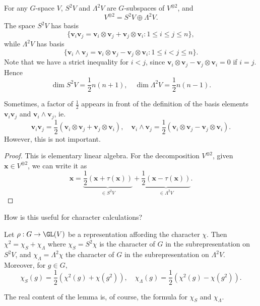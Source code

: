 \documentclass[a4paper]{article}
\begin{document}
\begin{lemma}
  For any $G$-space $V$, $S^2 V$ and $\Lambda^2 V$ are $G$-subspaces of $V^{\otimes 2}$, and
  \[
    V^{\otimes 2} = S^2 V \oplus \Lambda^2 V.
  \]
  The space $S^2 V$ has basis
  \[
    \{\mathbf{v}_i \mathbf{v}_j = \mathbf{v}_i \otimes \mathbf{v}_j + \mathbf{v}_j \otimes \mathbf{v}_i: 1 \leq i \leq j \leq n\},
  \]
  while $\Lambda^2 V$ has basis
  \[
    \{\mathbf{v}_i \wedge \mathbf{v}_j = \mathbf{v}_i \otimes \mathbf{v}_j - \mathbf{v}_j \otimes \mathbf{v}_i: 1 \leq i < j \leq n\}.
  \]
  Note that we have a strict inequality for $i < j$, since $\mathbf{v}_i \otimes \mathbf{v}_j - \mathbf{v}_j \otimes \mathbf{v}_i = 0$ if $i = j$.
  Hence
  \[
    \dim S^2 V = \frac{1}{2}n(n + 1),\quad \dim \Lambda^2 V = \frac{1}{2}n(n - 1).
  \]
\end{lemma}
Sometimes, a factor of $\frac{1}{2}$ appears in front of the definition of the basis elements $\mathbf{v}_i \mathbf{v}_j$ and $\mathbf{v}_i \wedge \mathbf{v}_j$, ie.
\[
  \mathbf{v}_i \mathbf{v}_j = \frac{1}{2}(\mathbf{v}_i \otimes \mathbf{v}_j + \mathbf{v}_j \otimes \mathbf{v}_i),\quad \mathbf{v}_i \wedge \mathbf{v}_j = \frac{1}{2}(\mathbf{v}_i \otimes \mathbf{v}_j - \mathbf{v}_j \otimes \mathbf{v}_i).
\]
However, this is not important.

\begin{proof}
  This is elementary linear algebra. For the decomposition $V^{\otimes 2}$, given $\mathbf{x} \in V^{\otimes 2}$, we can write it as
  \[
    \mathbf{x} = \underbrace{\frac{1}{2}(\mathbf{x} + \tau(\mathbf{x}))}_{\in S^2 V} + \underbrace{\frac{1}{2}(\mathbf{x} - \tau(\mathbf{x}))}_{\in \Lambda^2 V}.
  \]
\end{proof}

How is this useful for character calculations?
\begin{lemma}\index{$\Lambda^2 \chi$}
  Let $\rho: G \to \GL(V)$ be a representation affording the character $\chi$. Then $\chi^2 = \chi_S + \chi_{\Lambda}$ where $\chi_S = S^2 \chi$ is the character of $G$ in the subrepresentation on $S^2 V$, and $\chi_{\Lambda} = \Lambda^2 \chi$ the character of $G$ in the subrepresentation on $\Lambda^2 V$. Moreover, for $g \in G$,
  \[
    \chi_S(g) = \frac{1}{2} (\chi^2 (g) + \chi(g^2)),\quad \chi_\Lambda(g) = \frac{1}{2}(\chi^2(g) - \chi(g^2)).
  \]
\end{lemma}
The real content of the lemma is, of course, the formula for $\chi_S$ and $\chi_\Lambda$.
\end{document}
